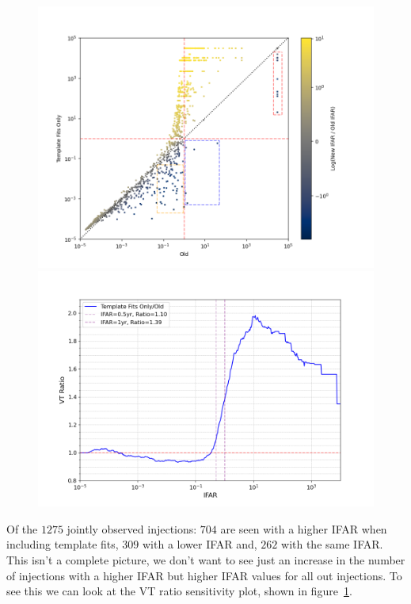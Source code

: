 \begin{figure}
  \centering
  \begin{minipage}[t]{0.9\linewidth}
  
    \includegraphics[width=1.2\textwidth]{images/pycbclive/fits_only_0s_ifar_vs_ifar_regions.png}
    \caption{}
    \label{fig:pycbclive-ifar-ifar-fits-only-0s}
    
    \includegraphics[width=1\textwidth]{images/pycbclive/fits_only_0s_vt_ratio.png}
    \caption{}
    \label{fig:pycbclive-sensitivity-fits-only-0s}

  \end{minipage}
\end{figure}
%
Of the $1275$ jointly observed injections: $704$ are seen with a higher IFAR when including template fits, $309$ with a lower IFAR and, $262$ with the same IFAR. This isn't a complete picture, we don't want to see just an increase in the number of injections with a higher IFAR but higher IFAR values for all out injections. To see this we can look at the VT ratio sensitivity plot, shown in figure~\ref{fig:pycbclive-sensitivity-fits-only-0s}.

